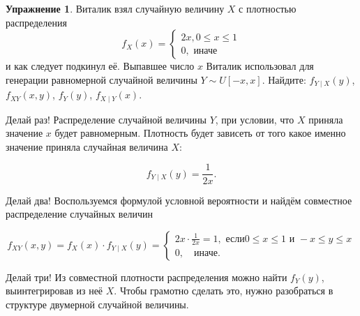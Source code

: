 \documentclass[12pt, a4paper, oneside]{extreport}
\theoremstyle{plain}              %
\theoremstyle{definition}         %
\newtheorem{problem}{\color{myblue} Упражнение}
\begin{document}
\begin{problem} 
Виталик взял случайную величину $X$  с плотностью распределения 
\[ 
f_X(x) = \begin{cases} 2x,  0 \le x \le 1 \\ 0, \text{ иначе} \end{cases}
\]	 
и как следует подкинул её. Выпавшее число  $x$ Виталик использовал для генерации равномерной случайной величины $Y \sim U[-x, x]$. Найдите: $f_{Y \mid X} (y)$,   $f_{XY}(x,y)$,  $f_Y(y)$,  $f_{X \mid Y} (x)$.

\begin{sol}
Делай раз! Распределение случайной величины $Y$, при условии, что $X$ приняла значение $x$ будет равномерным.  Плотность будет зависеть от того какое именно значение приняла случайная величина $X$: 

\[f_{Y \mid X}(y) = \frac{1}{2x}.\]
	
Делай два! Воспользуемся формулой условной вероятности и найдём совместное 	распределение случайных величин

\[f_{XY} (x,y) = f_X(x) \cdot f_{Y \mid X} (y) =  \begin{cases} 2x \cdot \frac{1}{2x} = 1, \text{ если} 0 \le x \le 1 \text{ и } -x \le y \le x  \\ 0, \quad \text{иначе}. \end{cases} \]
	
Делай  три! Из совместной плотности распределения можно найти $f_Y(y)$, выинтегрировав из неё $X$. Чтобы грамотно сделать это, нужно разобраться в структуре двумерной случайной величины. 

\begin{center}
\end{center} 


\end{sol}
\end{problem}
\end{document}
